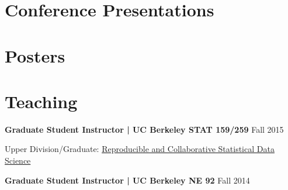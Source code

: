 \documentclass[margin,line]{res}
\let\resumesection\section
\newenvironment{list1}{
  \begin{list}{\ding{113}}{%
      \setlength{\itemsep}{0in}
      \setlength{\parsep}{0in} \setlength{\parskip}{0in}
      \setlength{\topsep}{0in} \setlength{\partopsep}{0in} 
      \setlength{\leftmargin}{0.17in}}}{\end{list}}
\begin{document}
\begin{resume}
\section{\sc Conference Presentations}

\renewcommand{\section}[2]{}
\renewcommand{\section}{\resumesection}

\section{\sc Posters}

\renewcommand{\section}[2]{}
\renewcommand{\section}{\resumesection}

\section{\sc Teaching\footnotemark}

{\bf Graduate Student Instructor | UC Berkeley STAT 159/259} \hfill Fall 2015 

\begin{list1}
\item[] Upper Division\footnotemark/Graduate: 
        \href{http://www.jarrodmillman.com/stat159-fall2015/}
             {Reproducible and Collaborative Statistical Data Science}
\end{list1}
{\bf Graduate Student Instructor | UC Berkeley NE 92} \hfill Fall 2014


\end{resume}
\end{document}
